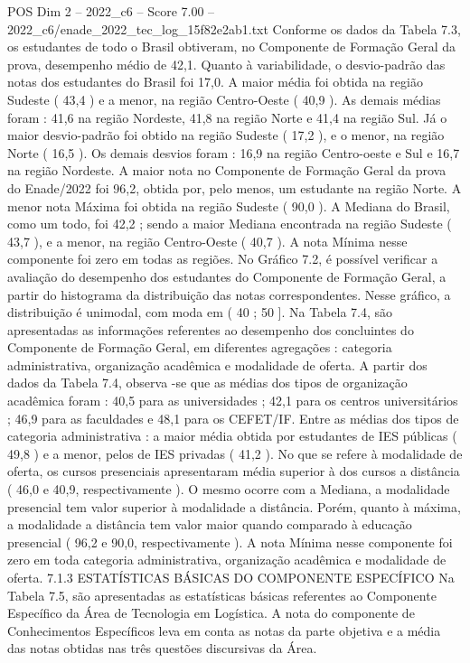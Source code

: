 \begin{textsample}{POS Dim 2 – 2022\_c6 – Score 7.00 – 2022\_c6/enade\_2022\_tec\_log\_15f82e2ab1.txt}
Conforme os dados da Tabela 7.3, os estudantes de todo o Brasil obtiveram, no Componente de Formação Geral da prova, desempenho médio de 42,1.
Quanto à variabilidade, o desvio-padrão das notas dos estudantes do Brasil foi 17,0.
A maior média foi obtida na região Sudeste ( 43,4 ) e a menor, na região Centro-Oeste ( 40,9 ).
As demais médias foram : 41,6 na região Nordeste, 41,8 na região Norte e 41,4 na região Sul.
Já o maior desvio-padrão foi obtido na região Sudeste ( 17,2 ), e o menor, na região Norte ( 16,5 ).
Os demais desvios foram : 16,9 na região Centro-oeste e Sul e 16,7 na região Nordeste.
A maior nota no Componente de Formação Geral da prova do Enade/2022 foi 96,2, obtida por, pelo menos, um estudante na região Norte.
A menor nota Máxima foi obtida na região Sudeste ( 90,0 ).
A Mediana do Brasil, como um todo, foi 42,2 ; sendo a maior Mediana encontrada na região Sudeste ( 43,7 ), e a menor, na região Centro-Oeste ( 40,7 ).
A nota Mínima nesse componente foi zero em todas as regiões.
No Gráfico 7.2, é possível verificar a avaliação do desempenho dos estudantes do Componente de Formação Geral, a partir do histograma da distribuição das notas correspondentes.
Nesse gráfico, a distribuição é unimodal, com moda em ( 40 ; 50 ].
Na Tabela 7.4, são apresentadas as informações referentes ao desempenho dos concluintes do Componente de Formação Geral, em diferentes agregações : categoria administrativa, organização acadêmica e modalidade de oferta.
A partir dos dados da Tabela 7.4, observa -se que as médias dos tipos de organização acadêmica foram : 40,5 para as universidades ; 42,1 para os centros universitários ; 46,9 para as faculdades e 48,1 para os CEFET/IF.
Entre as médias dos tipos de categoria administrativa : a maior média obtida por estudantes de IES públicas ( 49,8 ) e a menor, pelos de IES privadas ( 41,2 ).
No que se refere à modalidade de oferta, os cursos presenciais apresentaram média superior à dos cursos a distância ( 46,0 e 40,9, respectivamente ).
O mesmo ocorre com a Mediana, a modalidade presencial tem valor superior à modalidade a distância.
Porém, quanto à máxima, a modalidade a distância tem valor maior quando comparado à educação presencial ( 96,2 e 90,0, respectivamente ).
A nota Mínima nesse componente foi zero em toda categoria administrativa, organização acadêmica e modalidade de oferta. 7.1.3 ESTATÍSTICAS BÁSICAS DO COMPONENTE ESPECÍFICO Na Tabela 7.5, são apresentadas as estatísticas básicas referentes ao Componente Específico da Área de Tecnologia em Logística.
A nota do componente de Conhecimentos Específicos leva em conta as notas da parte objetiva e a média das notas obtidas nas três questões discursivas da Área.

\end{textsample}
